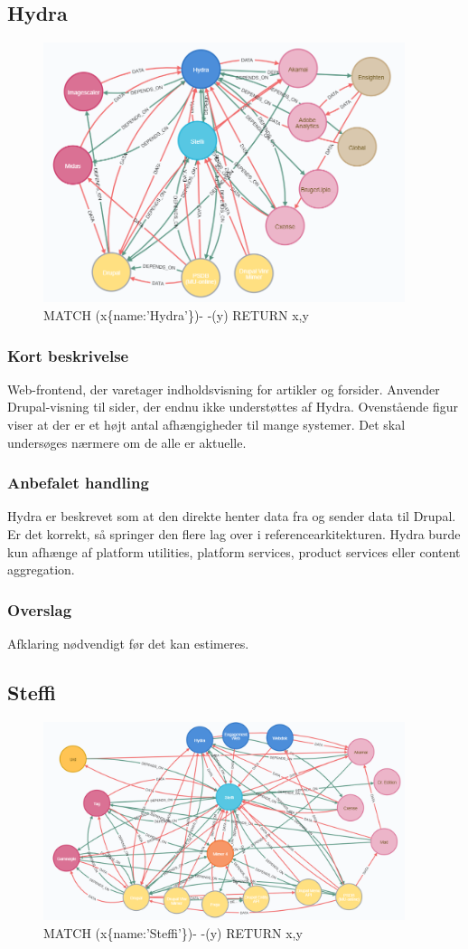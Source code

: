 \documentclass{article}
\begin{document}
\subsection{Hydra}
\begin{figure}[h]
\includegraphics[width=300pt]{Hydra.PNG}
\caption{MATCH (x\{name:'Hydra'\})- -(y) RETURN x,y}
\end{figure}
\subsubsection{Kort beskrivelse}
Web-frontend, der varetager indholdsvisning for artikler og forsider. Anvender Drupal-visning til sider, der endnu ikke understøttes af Hydra.
Ovenstående figur viser at der er et højt antal afhængigheder til mange systemer. Det skal undersøges nærmere om de alle er aktuelle.
\subsubsection{Anbefalet handling}
Hydra er beskrevet som at den direkte henter data fra og sender data til Drupal. Er det korrekt, så springer den flere lag over i referencearkitekturen.
Hydra burde kun afhænge af platform utilities, platform services, product services eller content aggregation.
\subsubsection{Overslag}
Afklaring nødvendigt før det kan estimeres.


\subsection{Steffi}
\begin{figure}[h]
\includegraphics[width=300pt]{Steffi.PNG}
\caption{MATCH (x\{name:'Steffi'\})- -(y) RETURN x,y}
\end{figure}
\end{document}
